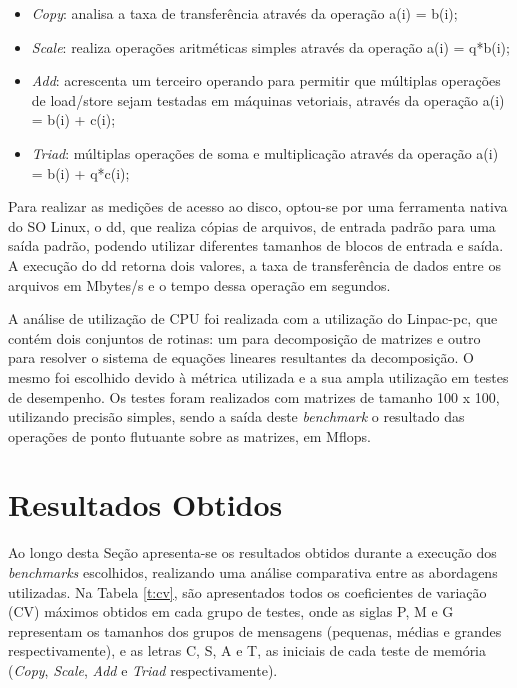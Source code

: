 \documentclass[times, 10pt,twocolumn]{article}
\begin{document}
\begin{itemize}
	\item \textit{Copy}: analisa a taxa de transferência através da operação 
		a(i) = b(i);
	\item \textit{Scale}: realiza operações aritméticas simples através da
		operação a(i) = q*b(i);
	\item \textit{Add}: acrescenta um terceiro operando para permitir que  
		múltiplas operações de load/store sejam testadas em máquinas vetoriais, 
		através da operação a(i) = b(i) + c(i);
	\item \textit{Triad}: múltiplas operações de soma e multiplicação através da
		operação a(i) = b(i) + q*c(i);
\end{itemize}

Para realizar as medições de acesso ao disco, optou-se por uma ferramenta nativa do
SO Linux, o dd, que realiza cópias de arquivos, de entrada padrão para uma saída 
padrão, podendo utilizar diferentes tamanhos de blocos de entrada e saída.
A execução do dd retorna dois valores, a taxa de transferência de dados entre os 
arquivos em Mbytes/s e o tempo dessa operação em segundos. 

A análise de utilização de CPU foi realizada com a utilização do Linpac-pc, que contém 
dois conjuntos de rotinas: um para decomposição de matrizes e outro para resolver 
o sistema de equações lineares resultantes da decomposição. O mesmo foi escolhido 
devido à métrica utilizada e a sua ampla utilização em testes de desempenho.
Os testes foram realizados com matrizes de tamanho 100 x 100, utilizando precisão simples,
sendo a saída deste \textit{benchmark} o resultado das operações de ponto flutuante 
sobre as matrizes, em Mflops.


\section {Resultados Obtidos}\label{s:res}
Ao longo desta Seção apresenta-se os resultados obtidos durante a execução 
dos \textit{benchmarks} escolhidos, realizando uma análise comparativa entre
as abordagens utilizadas. Na Tabela \ref{t:cv}, são apresentados todos os 
coeficientes de variação (CV) máximos obtidos em cada grupo de testes, onde
as siglas P, M e G representam os tamanhos dos grupos de mensagens (pequenas,
médias e grandes respectivamente), e as letras C, S, A e T, as iniciais de cada
teste de memória (\textit{Copy}, \textit{Scale}, \textit{Add} e \textit{Triad} 
respectivamente).
\end{document}
